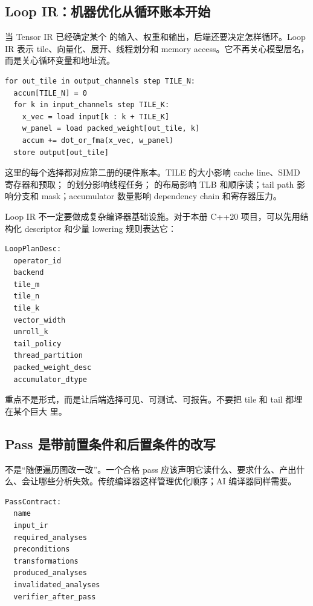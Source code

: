 \subsection{Loop IR：机器优化从循环账本开始}

当 Tensor IR 已经确定某个  的输入、权重和输出，后端还要决定怎样循环。Loop IR 表示 tile、向量化、展开、线程划分和 memory access。它不再关心模型层名，而是关心循环变量和地址流。

\begin{lstlisting}[numbers=none,caption={一个 GEMV lowering 后的循环账本}]
for out_tile in output_channels step TILE_N:
  accum[TILE_N] = 0
  for k in input_channels step TILE_K:
    x_vec = load input[k : k + TILE_K]
    w_panel = load packed_weight[out_tile, k]
    accum += dot_or_fma(x_vec, w_panel)
  store output[out_tile]
\end{lstlisting}

这里的每个选择都对应第二册的硬件账本。TILE 的大小影响 cache line、SIMD 寄存器和预取； 的划分影响线程任务； 的布局影响 TLB 和顺序读；tail path 影响分支和 mask；accumulator 数量影响 dependency chain 和寄存器压力。

Loop IR 不一定要做成复杂编译器基础设施。对于本册 C++20 项目，可以先用结构化 descriptor 和少量 lowering 规则表达它：

\begin{lstlisting}[numbers=none,caption={LoopPlanDesc 的保守工程形态}]
LoopPlanDesc:
  operator_id
  backend
  tile_m
  tile_n
  tile_k
  vector_width
  unroll_k
  tail_policy
  thread_partition
  packed_weight_desc
  accumulator_dtype
\end{lstlisting}

重点不是形式，而是让后端选择可见、可测试、可报告。不要把 tile 和 tail 都埋在某个巨大  里。

\subsection{Pass 是带前置条件和后置条件的改写}

 不是“随便遍历图改一改”。一个合格 pass 应该声明它读什么、要求什么、产出什么、会让哪些分析失效。传统编译器这样管理优化顺序；AI 编译器同样需要。

\begin{lstlisting}[numbers=none,caption={pass 合同的最小字段}]
PassContract:
  name
  input_ir
  required_analyses
  preconditions
  transformations
  produced_analyses
  invalidated_analyses
  verifier_after_pass
\end{lstlisting}

